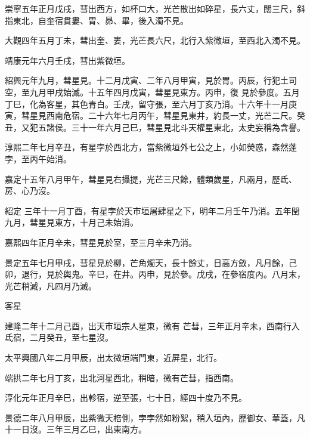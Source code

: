 \begin{pinyinscope}
 崇寧五年正月戊戌，彗出西方，如杯口大，光芒散出如碎星，長六丈，闊三尺，斜指東北，自奎宿貫婁、胃、昴、畢，後入濁不見。



 大觀四年五月丁未，彗出奎、婁，光芒長六尺，北行入紫微垣，至西北入濁不見。



 靖康元年六月壬戌，彗出紫微垣。



 紹興元年九月，彗星見。十二月戊寅、二年八月甲寅，見於胃。丙辰，行犯土司空，至九月甲戌始滅。十五年四月戊寅，彗星見東方。丙申，復
 見於參度。五月丁巳，化為客星，其色青白。壬戌，留守張，至六月丁亥乃消。十六年十一月庚寅，彗星見西南危宿。二十六年七月丙午，彗星見東井，約長一丈，光芒二尺。癸丑，又犯五諸侯。三十一年六月己巳，彗星見北斗天權星東北，太史妄稱為含譽。



 淳熙二年七月辛丑，有星孛於西北方，當紫微垣外七公之上，小如熒惑，森然蓬孛，至丙午始消。



 嘉定十五年八月甲午，彗星見右攝提，光芒三尺餘，體類歲星，凡兩月，歷氐、房、心乃沒。



 紹定
 三年十一月丁酉，有星孛於天市垣屠肆星之下，明年二月壬午乃消。五年閏九月，彗星見東方，十月己未始消。



 嘉熙四年正月辛未，彗星見於室，至三月辛未乃消。



 景定五年七月甲戌，彗星見於柳，芒角燭天，長十餘丈，日高方斂，凡月餘，己卯，退行，見於輿鬼。辛巳，在井。丙申，見於參。戊戌，在參宿度內。八月末，光芒稍減，凡四月乃滅。



 客星



 建隆二年十二月己酉，出天市垣宗人星東，微有
 芒彗，三年正月辛未，西南行入氐宿，二月癸丑，至七星沒。



 太平興國八年二月甲辰，出太微垣端門東，近屏星，北行。



 端拱二年七月丁亥，出北河星西北，稍暗，微有芒彗，指西南。



 淳化元年正月辛巳，出軫宿，逆至張，七十日，經四十度乃不見。



 景德二年八月甲辰，出紫微天棓側，孛孛然如粉絮，稍入垣內，歷御女、華蓋，凡十一日沒。三年三月乙巳，出東南方。




\end{pinyinscope}
